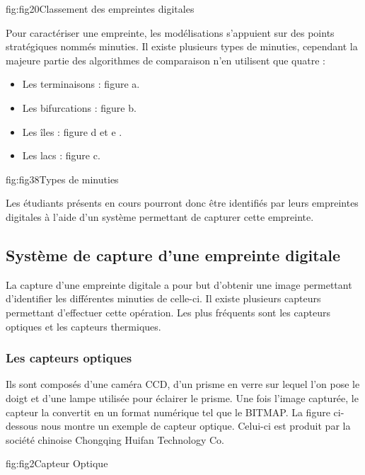 \documentclass[overfullbox]{polytech/polytech}
\begin{document}
\begin{Figure}{fig:fig20}{Classement des empreintes digitales}
\end{Figure}

 
Pour caractériser une empreinte, les modélisations s'appuient sur des points stratégiques nommés minuties. Il existe plusieurs types de minuties, cependant la majeure partie des algorithmes de comparaison n'en utilisent que quatre : 
\begin{itemize}
\item Les terminaisons : figure a.
 \item Les bifurcations :  figure b.
 \item Les îles : figure d et e .
 \item Les lacs : figure c.
\end{itemize}


\begin{Figure}{fig:fig38}{Types de minuties}
\end{Figure}

Les étudiants présents en cours pourront donc être identifiés par leurs empreintes digitales à l'aide d'un système permettant de capturer cette empreinte.

\subsection{Système de capture d'une empreinte digitale}
La capture d'une empreinte digitale a pour but d'obtenir une image permettant d'identifier les différentes minuties de celle-ci.
Il existe plusieurs capteurs permettant d'effectuer cette opération. Les plus fréquents sont les capteurs optiques et les capteurs thermiques.


\subsubsection {Les capteurs optiques}
Ils sont composés d'une caméra CCD, d'un prisme en verre sur lequel l'on pose le doigt et d'une lampe utilisée pour éclairer le prisme. Une fois l'image capturée, le capteur la convertit en un format numérique tel que le BITMAP. La figure ci-dessous nous montre un exemple de capteur optique. Celui-ci est produit par la société chinoise Chongqing Huifan Technology Co.


\begin{Figure}{fig:fig2}{Capteur Optique}
\end{Figure}
\end{document}
